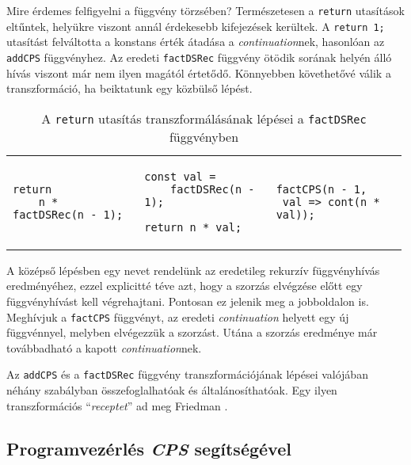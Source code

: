 Mire érdemes felfigyelni a függvény törzsében? Természetesen a \texttt{return} utasítások eltűntek, helyükre viszont annál érdekesebb kifejezések kerültek. A \texttt{return 1;} utasítást felváltotta a konstans érték átadása a \textit{continuation}nek, hasonlóan az \texttt{addCPS} függvényhez. Az eredeti \texttt{factDSRec} függvény ötödik sorának helyén álló hívás viszont már nem ilyen magától értetődő. Könnyebben követhetővé válik a transzformáció, ha beiktatunk egy közbülső lépést.

\lstset{language=JavaScript, numbers=none, breaklines=true}

\begin{table}[h]
\captionsetup{justification=centering}
\centering
\begin{tabular}{p{0.33\linewidth} | p{0.33\linewidth} | p{0.33\linewidth}}
\begin{lstlisting}
return
    n * factDSRec(n - 1);
\end{lstlisting}&
\begin{lstlisting}
const val =
    factDSRec(n - 1);

return n * val;
\end{lstlisting}&
\begin{lstlisting}
factCPS(n - 1, 
 val => cont(n * val));
\end{lstlisting} 
\end{tabular}
\caption{A \texttt{return} utasítás transzformálásának lépései a \texttt{factDSRec} függvényben}  
\label{table:steps}
\end{table}


A középső lépésben egy nevet rendelünk az eredetileg rekurzív függvényhívás eredményéhez, ezzel explicitté téve azt, hogy a szorzás elvégzése előtt egy függvényhívást kell végrehajtani. Pontosan ez jelenik meg a jobboldalon is. Meghívjuk a \texttt{factCPS} függvényt, az eredeti \textit{continuation} helyett egy új függvénnyel, melyben elvégezzük a szorzást. Utána a szorzás eredménye már továbbadható a kapott \textit{continuation}nek.

Az \texttt{addCPS} és a \texttt{factDSRec} függvény transzformációjának lépései valójában néhány szabályban összefoglalhatóak és általánosíthatóak. Egy ilyen transzformációs ``\textit{receptet}'' ad meg Friedman \citeyear{EssProgLan}.

\subsection{Programvezérlés \textit{CPS} segítségével}
